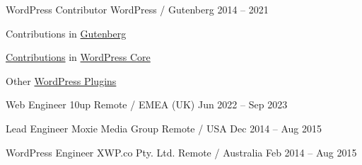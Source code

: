 



\begin{cventries}

  \cventry
    {WordPress Contributor} %
    {WordPress / Gutenberg} %
    {} %
    {2014 -- 2021} %
    {
      \begin{cvitems}
        \item {Contributions in \href{https://github.com/WordPress/gutenberg/pulls?q=is:pr+author:desaiuditd}{\color{awesome}Gutenberg}}
        \item {\href{https://core.trac.wordpress.org/report/25?USER=desaiuditd}{\color{awesome}Contributions} in \href{https://github.com/WordPress/wordpress-develop/pulls?q=is:pr+author:desaiuditd}{\color{awesome}WordPress Core}}
        \item {Other \href{https://profiles.wordpress.org/desaiuditd/\#content-plugins}{\color{awesome}WordPress Plugins}}
      \end{cvitems}
    }

\end{cventries}




\begin{cventries}

  \cventry
    {Web Engineer} %
    {10up} %
    {Remote / EMEA (UK)} %
    {Jun 2022 -- Sep 2023} %
    {}

  \cventry
    {Lead Engineer} %
    {Moxie Media Group} %
    {Remote / USA} %
    {Dec 2014 -- Aug 2015} %
    {}

  \cventry
    {WordPress Engineer} %
    {XWP.co Pty. Ltd.} %
    {Remote / Australia} %
    {Feb 2014 -- Aug 2015} %
    {}

\end{cventries}
